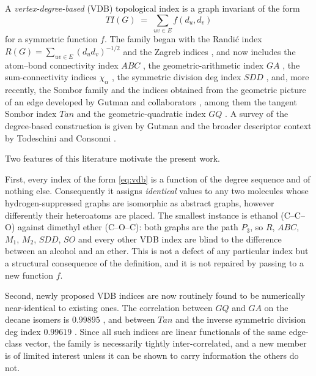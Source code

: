 \documentclass[11pt,a4paper]{article}
\theoremstyle{plain}
\theoremstyle{definition}
\theoremstyle{remark}
\begin{document}
A \emph{vertex-degree-based} (VDB) topological index is a graph invariant of the
form
\begin{equation}
\label{eq:vdb}
  TI(G) \;=\; \sum_{uv\in E} f(d_u,d_v)
\end{equation}
for a symmetric function $f$. The family began with the Randi\'c index
$R(G)=\sum_{uv\in E}(d_ud_v)^{-1/2}$ \cite{randic1975} and the Zagreb indices
\cite{gutman1972,gutman1975}, and now includes the atom--bond connectivity index
$ABC$ \cite{estrada1998}, the geometric-arithmetic index $GA$
\cite{vukicevic2009}, the sum-connectivity indices $\chi_\alpha$
\cite{zhou2009}, the symmetric division deg index $SDD$ \cite{vukicevic2010},
and, more recently, the Sombor family \cite{gutman2021,liu2022} and the indices
obtained from the geometric picture of an edge developed by Gutman and
collaborators \cite{gutman2024,oz2025,furtula2025}, among them the tangent
Sombor index $Tan$ \cite{oz2025} and the geometric-quadratic index $GQ$
\cite{kulli2022,furtula2025ijmc}. A survey of the degree-based construction is
given by Gutman \cite{gutman2013} and the broader descriptor context by
Todeschini and Consonni \cite{todeschini2009}.

Two features of this literature motivate the present work.

First, every index of the form \eqref{eq:vdb} is a function of the degree
sequence and of nothing else. Consequently it assigns \emph{identical} values to
any two molecules whose hydrogen-suppressed graphs are isomorphic as abstract
graphs, however differently their heteroatoms are placed. The smallest instance
is ethanol (C--C--O) against dimethyl ether (C--O--C): both graphs are the path
$P_3$, so $R$, $ABC$, $M_1$, $M_2$, $SDD$, $SO$ and every other VDB index are
blind to the difference between an alcohol and an ether. This is not a defect of
any particular index but a structural consequence of the definition, and it is
not repaired by passing to a new function $f$.

Second, newly proposed VDB indices are now routinely found to be numerically
near-identical to existing ones. The correlation between $GQ$ and $GA$ on the
decane isomers is $0.99895$ \cite{furtula2025ijmc}, and between $Tan$ and the
inverse symmetric division deg index $0.99619$ \cite{oz2025}. Since all such
indices are linear functionals of the same edge-class vector, the family is
necessarily tightly inter-correlated, and a new member is of limited interest
unless it can be shown to carry information the others do not.
\end{document}
